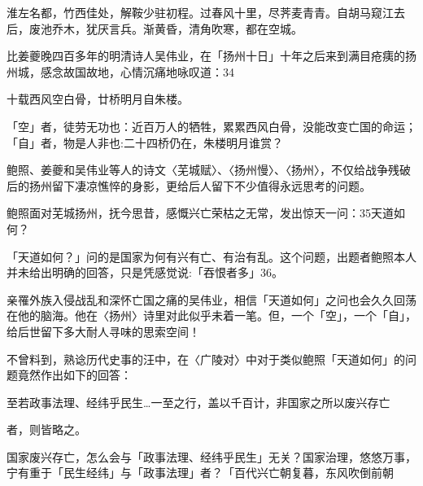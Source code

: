 \vfill
\begin{BookNotes}
\end{BookNotes}

\begin{BookQuote}
淮左名都，竹西佳处，解鞍少驻初程。过春风十里，尽荠麦青青。自胡马窥江去后，废池乔木，犹厌言兵。渐黄昏，清角吹寒，都在空城。
\end{BookQuote}

比姜夔晚四百多年的明清诗人吴伟业，在「扬州十日」十年之后来到满目疮痍的扬州城，感念故国故地，心情沉痛地咏叹道：34

\begin{BookQuote}
十载西风空白骨，廿桥明月自朱楼。
\end{BookQuote}

「空」者，徒劳无功也：近百万人的牺牲，累累西风白骨，没能改变亡国的命运；「自」者，物是人非也:二十四桥仍在，朱楼明月谁赏？

鲍照、姜夔和吴伟业等人的诗文〈芜城赋〉、〈扬州慢〉、〈扬州〉，不仅给战争残破后的扬州留下凄凉憔悴的身影，更给后人留下不少值得永远思考的问题。

鲍照面对芜城扬州，抚今思昔，感慨兴亡荣枯之无常，发出惊天一问：35天道如何？

「天道如何？」问的是国家为何有兴有亡、有治有乱。这个问题，出题者鲍照本人并未给出明确的回答，只是凭感觉说:「吞恨者多」36。

亲罹外族入侵战乱和深怀亡国之痛的吴伟业，相信「天道如何」之问也会久久回荡在他的脑海。他在〈扬州〉诗里对此似乎未着一笔。但，一个「空」，一个「自」，给后世留下多大耐人寻味的思索空间！

不曾料到，熟谂历代史事的汪中，在〈广陵对〉中对于类似鲍照「天道如何」的问题竟然作出如下的回答：

\begin{BookQuote}
至若政事法理、经纬乎民生…一至之行，盖以千百计，非国家之所以废兴存亡
\end{BookQuote}

者，则皆略之。

国家废兴存亡，怎么会与「政事法理、经纬乎民生」无关？国家治理，悠悠万事，宁有重于「民生经纬」与「政事法理」者？「百代兴亡朝复暮，东风吹倒前朝

\vfill
\begin{BookNotes}
\end{BookNotes}

